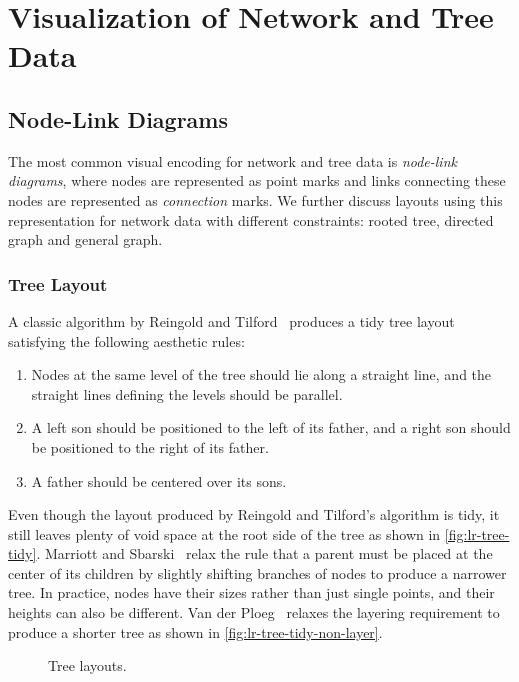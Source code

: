 \section{Visualization of Network and Tree Data}

\subsection{Node-Link Diagrams}
The most common visual encoding for network and tree data is \emph{node-link diagrams}, where nodes are represented as point marks and links connecting these nodes are represented as \emph{connection} marks. We further discuss layouts using this representation for network data with different constraints: rooted tree, directed graph and general graph.

\subsubsection{Tree Layout}
A classic algorithm by Reingold and Tilford~\cite{Reingold1981} produces a tidy tree layout satisfying the following aesthetic rules:
\begin{enumerate}
	\item Nodes at the same level of the tree should lie along a straight line, and the straight lines defining the levels should be parallel.
	\item A left son should be positioned to the left of its father, and a right son should be positioned to the right of its father.
	\item A father should be centered over its sons.
\end{enumerate} 

Even though the layout produced by Reingold and Tilford's algorithm is tidy, it still leaves plenty of void space at the root side of the tree as shown in \autoref{fig:lr-tree-tidy}. Marriott and Sbarski~\cite{Marriott2007} relax the rule that a parent must be placed at the center of its children by slightly shifting branches of nodes to produce a narrower tree. In practice, nodes have their sizes rather than just single points, and their heights can also be different. Van der Ploeg~\cite{VanderPloeg2014} relaxes the layering requirement to produce a shorter tree as shown in \autoref{fig:lr-tree-tidy-non-layer}.

\begin{figure}[!htb]
\centering
{}
\hfill
{}
\caption{Tree layouts.}
\end{figure}

